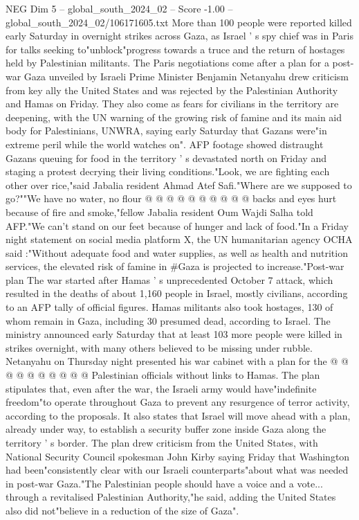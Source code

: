 \begin{textsample}{NEG Dim 5 – global\_south\_2024\_02 – Score -1.00 – global\_south\_2024\_02/106171605.txt}  \label{ex:f5_neg_252}
More than 100 people were reported killed early Saturday in overnight strikes across Gaza, as Israel ' s spy chief was in Paris for talks seeking to"unblock"progress towards a truce and the return of hostages held by Palestinian militants.
The Paris negotiations come after a plan for a post-war Gaza unveiled by Israeli Prime Minister Benjamin Netanyahu drew criticism from key ally the United States and was rejected by the Palestinian Authority and Hamas on Friday.
They also come as fears for civilians in the territory are deepening, with the UN warning of the growing risk of famine and its main aid body for Palestinians, UNWRA, saying early Saturday that Gazans were"in extreme peril while the world watches on".
AFP footage showed distraught Gazans queuing for food in the territory ' s devastated north on Friday and staging a protest decrying their living conditions."Look, we are fighting each other over rice,"said Jabalia resident Ahmad Atef Safi."Where are we supposed to go?""We have no water, no flour @ @ @ @ @ @ @ @ @ @ backs and eyes hurt because of fire and smoke,"fellow Jabalia resident Oum Wajdi Salha told AFP."We can't stand on our feet because of hunger and lack of food."In a Friday night statement on social media platform X, the UN humanitarian agency OCHA said :"Without adequate food and water supplies, as well as health and nutrition services, the elevated risk of famine in \#Gaza is projected to increase."Post-war plan The war started after Hamas ' s unprecedented October 7 attack, which resulted in the deaths of about 1,160 people in Israel, mostly civilians, according to an AFP tally of official figures.
Hamas militants also took hostages, 130 of whom remain in Gaza, including 30 presumed dead, according to Israel.
The ministry announced early Saturday that at least 103 more people were killed in strikes overnight, with many others believed to be missing under rubble.
Netanyahu on Thursday night presented his war cabinet with a plan for the @ @ @ @ @ @ @ @ @ @ Palestinian officials without links to Hamas.
The plan stipulates that, even after the war, the Israeli army would have"indefinite freedom"to operate throughout Gaza to prevent any resurgence of terror activity, according to the proposals.
It also states that Israel will move ahead with a plan, already under way, to establish a security buffer zone inside Gaza along the territory ' s border.
The plan drew criticism from the United States, with National Security Council spokesman John Kirby saying Friday that Washington had been"consistently clear with our Israeli counterparts"about what was needed in post-war Gaza."The Palestinian people should have a voice and a vote... through a revitalised Palestinian Authority,"he said, adding the United States also did not"believe in a reduction of the size of Gaza".

\end{textsample}
